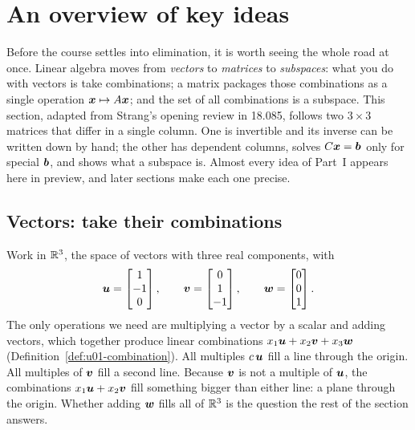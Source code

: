 \section{An overview of key ideas}\label{sec:u02}

Before the course settles into elimination, it is worth seeing the whole road at once.
Linear algebra moves from \emph{vectors} to \emph{matrices} to \emph{subspaces}: what you do
with vectors is take combinations; a matrix packages those combinations as a single
operation $\boldsymbol{x}\mapsto A\boldsymbol{x}$; and the set of all combinations is a subspace. This
section, adapted from Strang's opening review in 18.085, follows two $3\times3$ matrices that
differ in a single column. One is invertible and its inverse can be written down by hand; the
other has dependent columns, solves $C\boldsymbol{x}=\boldsymbol{b}$ only for special $\boldsymbol{b}$, and shows
what a subspace is. Almost every idea of Part~I appears here in preview, and later sections
make each one precise.

\subsection{Vectors: take their combinations}

Work in $\mathbb{R}^3$, the space of vectors with three real components, with
\[
  \boldsymbol{u}=\begin{bmatrix} 1\\ -1\\ 0\end{bmatrix},\qquad
  \boldsymbol{v}=\begin{bmatrix} 0\\ 1\\ -1\end{bmatrix},\qquad
  \boldsymbol{w}=\begin{bmatrix} 0\\ 0\\ 1\end{bmatrix}.
\]
The only operations we need are multiplying a vector by a scalar and adding vectors, which
together produce linear combinations $x_1\boldsymbol{u}+x_2\boldsymbol{v}+x_3\boldsymbol{w}$
(Definition~\ref{def:u01-combination}). All multiples $c\,\boldsymbol{u}$ fill a line through the
origin. All multiples of $\boldsymbol{v}$ fill a second line. Because $\boldsymbol{v}$ is not a multiple of
$\boldsymbol{u}$, the combinations $x_1\boldsymbol{u}+x_2\boldsymbol{v}$ fill something bigger than either line: a
plane through the origin. Whether adding $\boldsymbol{w}$ fills all of $\mathbb{R}^3$ is the question the
rest of the section answers.

